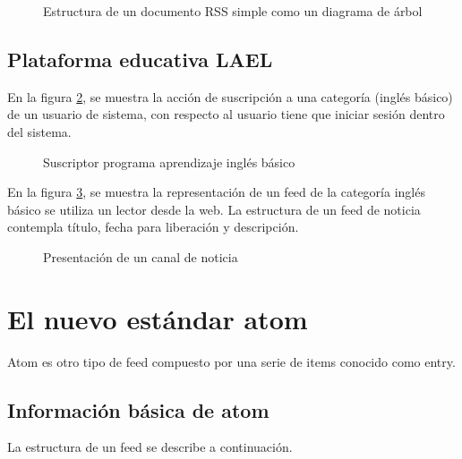 \begin{figure}[h!]
	\centering
	\caption{Estructura de un documento RSS simple como un diagrama de árbol}
	\label{fig:Estructura de un documento RSS simple como un diagrama de árbol}
\end{figure}


\subsection{Plataforma educativa LAEL}

En la figura \ref{fig:Suscriptor programa aprendizaje inglés básico}, se
muestra la acción de suscripción a una categoría (inglés básico) de un
usuario de sistema, con respecto al usuario tiene que iniciar sesión dentro 
del sistema. 

\begin{figure}[h!]
	\centering
	\caption{Suscriptor programa aprendizaje inglés básico}
	\label{fig:Suscriptor programa aprendizaje inglés básico}
\end{figure}


En la figura \ref{fig:Presentación de un canal de noticia}, se muestra la
representación de un feed de la categoría inglés básico se utiliza un lector
desde la web. La estructura de un feed de noticia contempla título, fecha
para liberación y descripción.
 
\begin{figure}[h!]
	\centering
	\caption{Presentación de un canal de noticia}
	\label{fig:Presentación de un canal de noticia}
\end{figure}

\section{El nuevo estándar atom}

Atom es otro tipo de feed compuesto por una serie de items
conocido como entry.

\subsection{Información básica de atom}

La estructura de un feed se describe a continuación.


